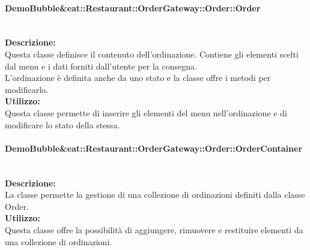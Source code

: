 \paragraph{Demo\-Bubble\&eat\-::Restaurant\-::Order\-Gateway\-::Order\-::Order}\label{eat-order}\mbox{}\\ 
\textbf{Descrizione:}\\
Questa classe definisce il contenuto dell'ordinazione. Contiene gli elementi scelti dal menu e i dati forniti dall'utente per la consegna.\\
L'ordinazione è definita anche da uno stato e la classe offre i metodi per modificarlo. \\
\textbf{Utilizzo:}\\
Questa classe permette di inserire gli elementi del menu nell'ordinazione e di modificare lo stato della stessa. 

\paragraph{Demo\-Bubble\&eat\-::Restaurant\-::Order\-Gateway\-::Order\-::Order\-Contai\-ner}\label{eat-container}\mbox{}\\
\textbf{Descrizione:}\\
La classe permette la gestione di una collezione di ordinazioni definiti dalla classe Order.\\
\textbf{Utilizzo:}\\
Questa classe offre la possibilità di aggiungere, rimuovere e restituire elementi da una collezione di ordinazioni.